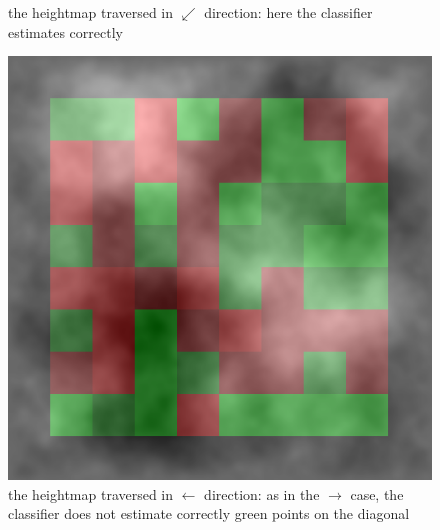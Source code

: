 \documentclass[]{usiinfbachelorproject}
\begin{document}
\begin{figure}[H]
    \caption{the heightmap traversed in $\swarrow$ direction: here the classifier estimates correctly}\label{fig:heatmap135}
\endminipage\hfill
{}
  \includegraphics[width=\linewidth]{heatmap180}
    \caption{the heightmap traversed in $\leftarrow$ direction: as in the $\rightarrow$ case, the classifier does not estimate correctly green points on the diagonal}\label{fig:heatmap180}
\endminipage\hfill
\end{figure}
\end{document}
